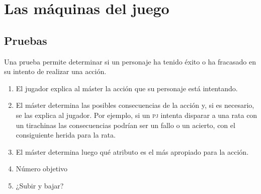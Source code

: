 \chapter{Las máquinas del juego}

\section{Pruebas}

Una prueba permite determinar si un personaje ha tenido éxito o ha fracasado en su intento de realizar una acción.

\begin{enumerate}
\item El jugador explica al máster la acción que su personaje está intentando.
\item El máster determina las posibles consecuencias de la acción y, si es necesario, se las explica al jugador. Por ejemplo, si un \textsc{pj} intenta disparar a una rata con un tirachinas las consecuencias podrían ser un fallo o un acierto, con el consiguiente herida para la rata.
\item El máster determina luego qué atributo es el más apropiado para la acción.
\item Número objetivo
\item ¿Subir y bajar?
\end{enumerate}



